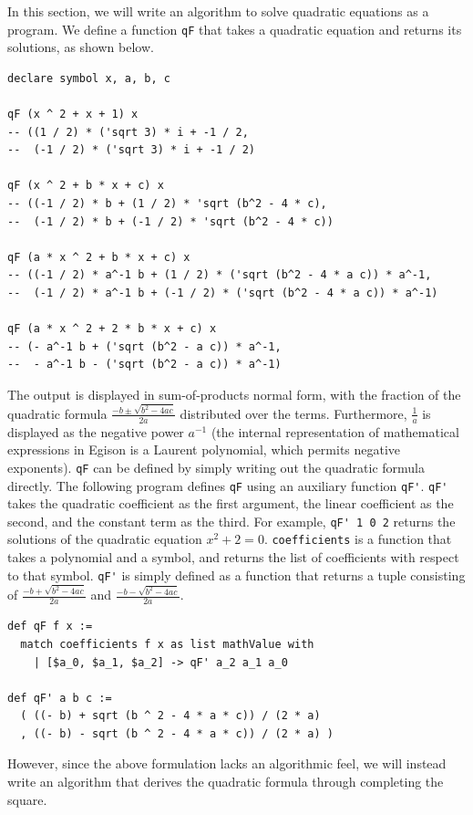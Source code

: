 In this section, we will write an algorithm to solve quadratic equations as a program.
We define a function \lstinline{qF} that takes a quadratic equation and returns its solutions, as shown below.
\begin{lstlisting}[language=egison,numbers=none]
declare symbol x, a, b, c

qF (x ^ 2 + x + 1) x
-- ((1 / 2) * ('sqrt 3) * i + -1 / 2,
--  (-1 / 2) * ('sqrt 3) * i + -1 / 2)

qF (x ^ 2 + b * x + c) x
-- ((-1 / 2) * b + (1 / 2) * 'sqrt (b^2 - 4 * c),
--  (-1 / 2) * b + (-1 / 2) * 'sqrt (b^2 - 4 * c))

qF (a * x ^ 2 + b * x + c) x
-- ((-1 / 2) * a^-1 b + (1 / 2) * ('sqrt (b^2 - 4 * a c)) * a^-1,
--  (-1 / 2) * a^-1 b + (-1 / 2) * ('sqrt (b^2 - 4 * a c)) * a^-1)

qF (a * x ^ 2 + 2 * b * x + c) x
-- (- a^-1 b + ('sqrt (b^2 - a c)) * a^-1,
--  - a^-1 b - ('sqrt (b^2 - a c)) * a^-1)
\end{lstlisting}
The output is displayed in sum-of-products normal form, with the fraction of the quadratic formula $\frac{-b \pm \sqrt{b^2 - 4 a c}}{2 a}$ distributed over the terms.
Furthermore, $\frac{1}{a}$ is displayed as the negative power $a^{-1}$ (the internal representation of mathematical expressions in Egison is a Laurent polynomial, which permits negative exponents).
\lstinline{qF} can be defined by simply writing out the quadratic formula directly.
The following program defines \lstinline{qF} using an auxiliary function \lstinline{qF'}.
\lstinline{qF'} takes the quadratic coefficient as the first argument, the linear coefficient as the second, and the constant term as the third.
For example, \lstinline{qF' 1 0 2} returns the solutions of the quadratic equation $x^2 + 2 = 0$.
\lstinline{coefficients} is a function that takes a polynomial and a symbol, and returns the list of coefficients with respect to that symbol.
\lstinline{qF'} is simply defined as a function that returns a tuple consisting of $\frac{-b + \sqrt{b^2 - 4 a c}}{2 a}$ and $\frac{-b - \sqrt{b^2 - 4 a c}}{2 a}$.
\begin{lstlisting}[language=egison,numbers=none]
def qF f x :=
  match coefficients f x as list mathValue with
    | [$a_0, $a_1, $a_2] -> qF' a_2 a_1 a_0

def qF' a b c :=
  ( ((- b) + sqrt (b ^ 2 - 4 * a * c)) / (2 * a)
  , ((- b) - sqrt (b ^ 2 - 4 * a * c)) / (2 * a) )
\end{lstlisting}
However, since the above formulation lacks an algorithmic feel, we will instead write an algorithm that derives the quadratic formula through completing the square.
